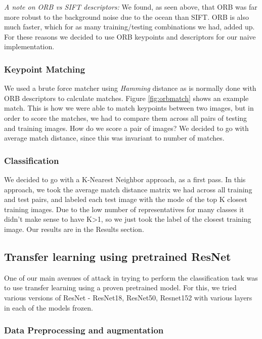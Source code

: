 \textit{A note on ORB vs SIFT descriptors:} We found, as seen above, that ORB was far more robust to the background noise due to the ocean than SIFT. ORB is also much faster, which for as many training/testing combinations we had, added up. For these reasons we decided to use ORB keypoints and descriptors for our naive implementation. 

\subsubsection{Keypoint Matching}

We used a brute force matcher using \textit{Hamming} distance as is normally done with ORB descriptors to calculate matches. Figure \ref{fig:orbmatch} shows an example match. This is how we were able to match keypoints between two images, but in order to score the matches, we had to compare them across all pairs of testing and training images. How do we score a pair of images? We decided to go with average match distance, since this was invariant to number of matches.

\subsubsection{Classification}

We decided to go with a K-Nearest Neighbor approach, as a first pass. In this approach, we took the average match distance matrix we had across all training and test pairs, and labeled each test image with the mode of the top K closest training images. Due to the low number of representatives for many classes it didn't make sense to have K>1, so we just took the label of the closest training image. Our results are in the Results section.

\subsection{Transfer learning using pretrained ResNet}

One of our main avenues of attack in trying to perform the classification task was to use transfer learning using a proven pretrained model. For this, we tried various versions of ResNet \cite{he2016deep} - ResNet18, ResNet50, Resnet152 with various layers in each of the models frozen.

\subsubsection{Data Preprocessing and augmentation}


